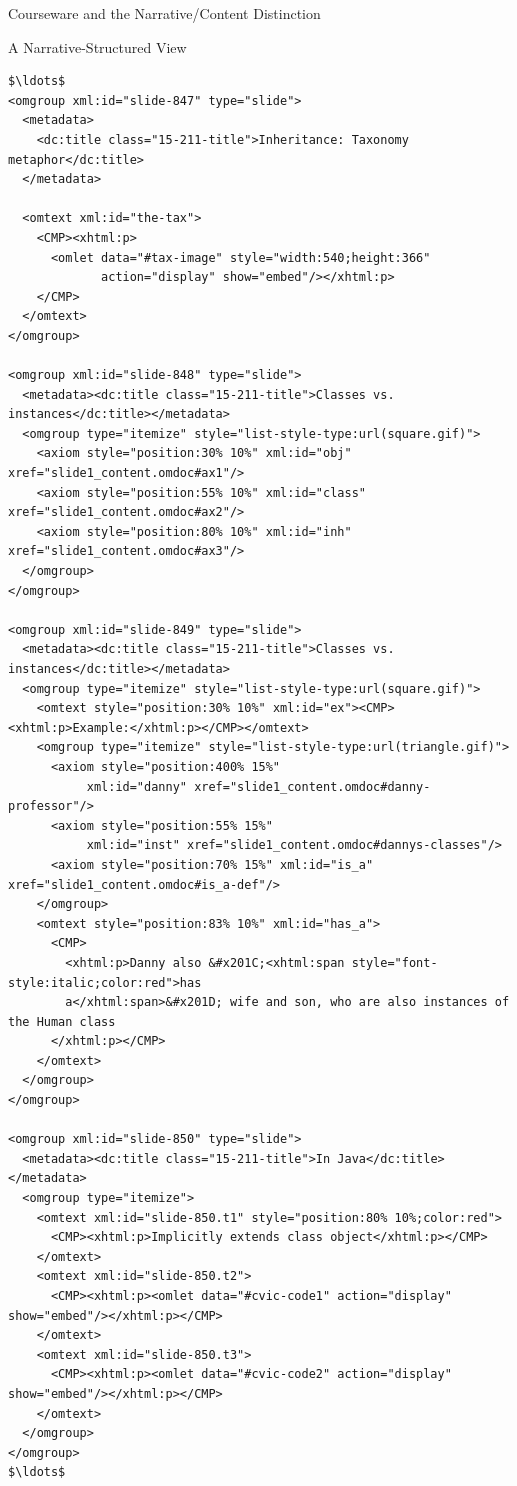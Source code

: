 \begin{tchapter}[id=courseware]{Courseware and the Narrative/Content Distinction}
\begin{tsection}[id=narrative-structured]{A Narrative-Structured View}
\begin{lstlisting}[label=lst:ann-narrative,mathescape,
    caption={The Narrative {\omdoc}  for {\myfigref{15-211}}},
    index={omgroup,omtext,CMP,metadata,dc:title,ref}]
$\ldots$
<omgroup xml:id="slide-847" type="slide">
  <metadata>
    <dc:title class="15-211-title">Inheritance: Taxonomy metaphor</dc:title>
  </metadata>
  
  <omtext xml:id="the-tax">
    <CMP><xhtml:p>
      <omlet data="#tax-image" style="width:540;height:366" 
             action="display" show="embed"/></xhtml:p>
    </CMP>
  </omtext>
</omgroup>

<omgroup xml:id="slide-848" type="slide">
  <metadata><dc:title class="15-211-title">Classes vs. instances</dc:title></metadata>
  <omgroup type="itemize" style="list-style-type:url(square.gif)">
    <axiom style="position:30% 10%" xml:id="obj" xref="slide1_content.omdoc#ax1"/>
    <axiom style="position:55% 10%" xml:id="class" xref="slide1_content.omdoc#ax2"/>
    <axiom style="position:80% 10%" xml:id="inh" xref="slide1_content.omdoc#ax3"/>
  </omgroup>
</omgroup>

<omgroup xml:id="slide-849" type="slide">
  <metadata><dc:title class="15-211-title">Classes vs. instances</dc:title></metadata>
  <omgroup type="itemize" style="list-style-type:url(square.gif)">
    <omtext style="position:30% 10%" xml:id="ex"><CMP><xhtml:p>Example:</xhtml:p></CMP></omtext>
    <omgroup type="itemize" style="list-style-type:url(triangle.gif)">
      <axiom style="position:400% 15%" 
           xml:id="danny" xref="slide1_content.omdoc#danny-professor"/>
      <axiom style="position:55% 15%" 
           xml:id="inst" xref="slide1_content.omdoc#dannys-classes"/>
      <axiom style="position:70% 15%" xml:id="is_a" xref="slide1_content.omdoc#is_a-def"/>
    </omgroup>
    <omtext style="position:83% 10%" xml:id="has_a">
      <CMP>
        <xhtml:p>Danny also &#x201C;<xhtml:span style="font-style:italic;color:red">has
        a</xhtml:span>&#x201D; wife and son, who are also instances of the Human class
      </xhtml:p></CMP>
    </omtext>
  </omgroup>
</omgroup>

<omgroup xml:id="slide-850" type="slide">
  <metadata><dc:title class="15-211-title">In Java</dc:title></metadata>
  <omgroup type="itemize">
    <omtext xml:id="slide-850.t1" style="position:80% 10%;color:red">
      <CMP><xhtml:p>Implicitly extends class object</xhtml:p></CMP>
    </omtext>
    <omtext xml:id="slide-850.t2">
      <CMP><xhtml:p><omlet data="#cvic-code1" action="display" show="embed"/></xhtml:p></CMP>
    </omtext>
    <omtext xml:id="slide-850.t3">
      <CMP><xhtml:p><omlet data="#cvic-code2" action="display" show="embed"/></xhtml:p></CMP>  
    </omtext>
  </omgroup>
</omgroup>
$\ldots$
\end{lstlisting}
\end{tsection}


\end{tchapter}
